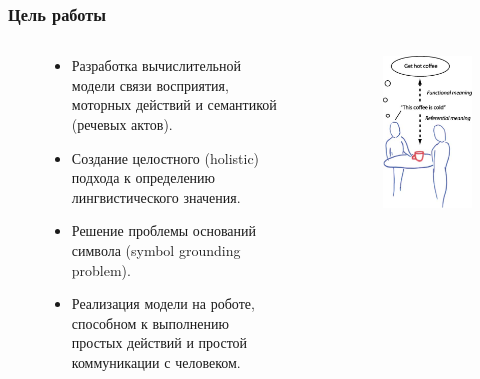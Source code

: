 \documentclass[default]{beamer}
\begin{document}
	\begin{frame}
		\frametitle{Цель работы}
		
		\begin{columns}
			\begin{column}{0.7\textwidth}
				\begin{figure}
					\begin{itemize}
						\item Разработка вычислительной модели связи восприятия, моторных действий и семантикой (речевых актов).
						\item Создание целостного (holistic) подхода к определению лингвистического значения.
						\item Решение проблемы оснований символа (symbol grounding problem).
						\item Реализация модели на роботе, способном к выполнению простых действий и простой коммуникации с человеком.
					\end{itemize}
				\end{figure}
			\end{column}
			\begin{column}{0.3\textwidth}
				\begin{figure}
					\includegraphics[width=\textwidth]{roy_meaning}

\end{figure}
\end{column}
\end{columns}
\end{frame}
\end{document}

